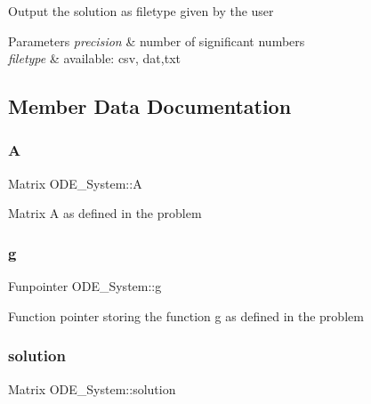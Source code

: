 Output the solution as filetype given by the user~\newline

\begin{DoxyParams}{Parameters}
{\em precision} & number of significant numbers~\newline
\\
\hline
{\em filetype} & available\+: csv, dat,txt \\
\hline
\end{DoxyParams}


\subsection{Member Data Documentation}
\mbox{\label{class_o_d_e___system_a632009677e80b62a1996e842398bf8b6}} 
\subsubsection{\texorpdfstring{A}{A}}
{\footnotesize\ttfamily Matrix O\+D\+E\+\_\+\+System\+::A\hspace{0.3cm}{\ttfamily [protected]}}

Matrix A as defined in the problem \mbox{\label{class_o_d_e___system_a2dee2a4b3468547c3ddab15edfc8ddfd}} 
\subsubsection{\texorpdfstring{g}{g}}
{\footnotesize\ttfamily Funpointer O\+D\+E\+\_\+\+System\+::g\hspace{0.3cm}{\ttfamily [protected]}}

Function pointer storing the function g as defined in the problem \mbox{\label{class_o_d_e___system_ab2504680346a353e353f147f1ad9c51d}} 
\subsubsection{\texorpdfstring{solution}{solution}}
{\footnotesize\ttfamily Matrix O\+D\+E\+\_\+\+System\+::solution\hspace{0.3cm}{\ttfamily [protected]}}

